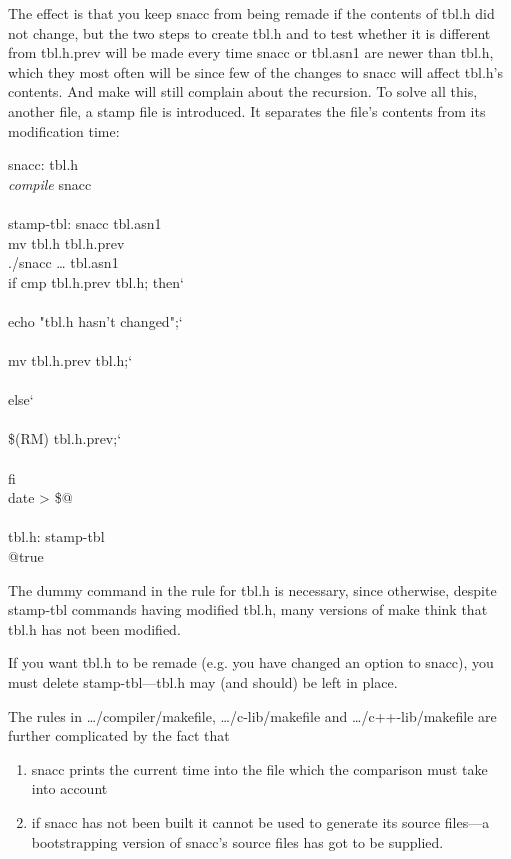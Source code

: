 The effect is that you keep snacc from being remade if the contents of tbl.h did not change, but the two steps to create tbl.h and to test whether it is different from tbl.h.prev will be made every time snacc or tbl.asn1 are newer than tbl.h, which they most often will be since few of the changes to snacc will affect tbl.h's contents.
And {\ufn make} will still complain about the recursion.
To solve all this, another file, a stamp file is introduced.
It separates the file's contents from its modification time:

\begin{Makefile}
snacc:		\>tbl.h\\
		\>\emph{compile} snacc\\
\\
stamp-tbl:	\>snacc tbl.asn1\\
		\>mv tbl.h tbl.h.prev\\
		\>./snacc \dots{} tbl.asn1\\
		\>if cmp tbl.h.prev tbl.h; then\char`\\\\
		\>\>  echo "tbl.h hasn't changed";\char`\\\\
		\>\>  mv tbl.h.prev tbl.h;\char`\\\\
		\>else\char`\\\\
		\>\>  \$(RM) tbl.h.prev;\char`\\\\
		\>fi\\
		\>date > \$@\\
\\
tbl.h:		\>stamp-tbl\\
		\>@true\\
\end{Makefile}

The dummy command in the rule for tbl.h is necessary, since otherwise, despite stamp-tbl commands having modified tbl.h, many versions of make think that tbl.h has not been modified.

If you want {\ufn tbl.h} to be remade (e.g. you have changed an option to snacc), you must delete {\ufn stamp-tbl}---{\ufn tbl.h} may (and should) be left in place.

The rules in {\ufn \dots/compiler/makefile}, {\ufn \dots/c-lib/makefile} and {\ufn \dots/c++-lib/makefile} are further complicated by the fact that
\begin{enumerate}
  \item snacc prints the current time into the file which the comparison must take into account
  \item if snacc has not been built it cannot be used to generate its source files---a bootstrapping version of snacc's source files has got to be supplied.
\end{enumerate}

